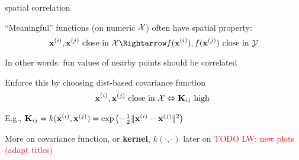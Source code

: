 \documentclass[11pt,compress,t,notes=noshow, xcolor=table]{beamer}
\begin{document}

\begin{framei}{spatial correlation}
\item ``Meaningful'' functions (on numeric $\Xspace$) often have spatial property:
$$\xi, \xi[j] \text{ close in } \Xspace \Rightarrow f(\xi), f(\xi[j]) \text{ close in } \Yspace$$
\item In other words: fun values of nearby points should be correlated
\item Enforce this by choosing dist-based covariance function
$$ \xi[i], \xi[j] \text{ close in } \Xspace \Leftrightarrow \Kmat_{ij} \text{ high }$$
\item E.g., $\Kmat_{ij} = k(\xi, \xi[j]) = \exp \left(- \tfrac{1}{2} \| \xi - \xi[j] \|^2 \right)$
\vfill
{}
\item More on covariance function, or \textbf{kernel}, $k(\cdot, \cdot)$ later on
\textcolor{red}{TODO LW: new plots (adapt titles)}
\end{framei} 

\end{document}
